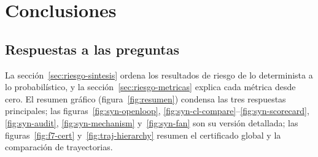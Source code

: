 \section{Conclusiones}\label{sec:conclusiones}

\subsection{Respuestas a las preguntas}
La sección~\ref{sec:riesgo-sintesis} ordena los resultados de riesgo de lo determinista a lo
probabilístico, y la sección~\ref{sec:riesgo-metricas} explica cada métrica desde cero. El
resumen gráfico (figura~\ref{fig:resumen}) condensa las tres respuestas principales; las
figuras~\ref{fig:syn-openloop}, \ref{fig:syn-cl-compare}--\ref{fig:syn-scorecard},
\ref{fig:syn-audit}, \ref{fig:syn-mechanism} y~\ref{fig:syn-fan} son su versión detallada;
las figuras~\ref{fig:f7-cert} y~\ref{fig:traj-hierarchy} resumen el certificado global y la
comparación de trayectorias.
